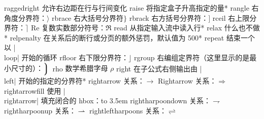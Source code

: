 \capcs raggedright {允许右边距在行与行间变化}{}{}
\capcs raise {将指定盒子升高指定的量}*{}
\capcs rangle {右角度分界符：$\rangle$}{}{}
\capcs rbrace {右大括号分界符$\rbrace$}{}{}
\capcs rbrack {右方括号分界符：$\rbrack$}{}{}
\capcs rceil {右上限分界符：$\rceil$}{}{}
\capcs Re {复数实数部分符号：$\Re$}{}{}
\capcs read {从指定输入流中读入行}*{}
\capcs relax {什么也不做}*{}
\capcs relpenalty {在关系后的断行或分页的额外惩罚，默认值为 500}*{}
\capcs repeat {结束一个以 |\\loop| 开始的循环}{}{\@repeat}
\capcs rfloor {右下限分界符：$\rfloor$}{}{}
\capcs rgroup {右编组定界符（这里显示的是最小尺寸的）：$\Big\rgroup$}{}{}
\capcs rho {数学希腊字母 $\rho$}{}{}
\capcs right {在子公式右侧输出由 |\\left| 开始的指定的分界符}*{}
\capcs rightarrow {关系：$\rightarrow$}{}{}
\capcs Rightarrow {关系：$\Rightarrow$}{}{}
\capcs rightarrowfill {使用 |\\rightarrow| 填充闭合的 hbox：\hbox to 3.5em{\rightarrowfill}}{}{}
\capcs rightharpoondown {关系：$\rightharpoondown$}{}{}
\capcs rightharpoonup {关系：$\rightharpoonup$}{}{}
\capcs rightleftharpoons {关系：$\rightleftharpoons$}{}{}
